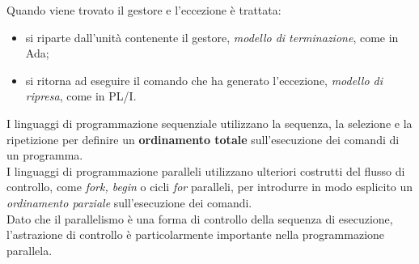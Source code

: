 \documentclass[12pt]{report}
\begin{document}
 	Quando viene trovato il gestore e l'eccezione è trattata:
 	\begin{itemize}
 		\item si riparte dall'unità contenente il gestore, \textit{modello di terminazione}, come in Ada;
 		\item si ritorna ad eseguire il comando che ha generato l'eccezione, \textit{modello di ripresa}, come in PL/I.
 	\end{itemize}
 	I linguaggi di programmazione sequenziale utilizzano la sequenza, la selezione e la ripetizione per definire un \textbf{ordinamento totale} sull'esecuzione dei comandi di un programma. \\
 	I linguaggi di programmazione paralleli utilizzano ulteriori costrutti del flusso di controllo, come \textit{fork, begin} o cicli \textit{for} paralleli, per introdurre in modo esplicito un \textit{ordinamento parziale} sull'esecuzione dei comandi.\\
 	Dato che il parallelismo è una forma di controllo della sequenza di esecuzione, l'astrazione di controllo è particolarmente importante nella programmazione parallela.
\end{document}
